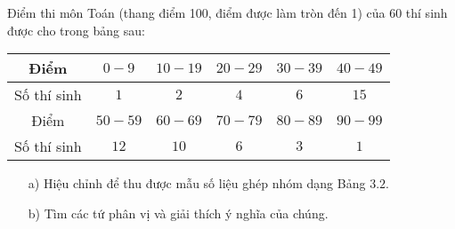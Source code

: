 \begin{bt}%
	Điểm thi môn Toán (thang điểm 100, điểm được làm tròn đến 1) của 60 thí sinh được cho trong bảng sau:
	\begin{center}
		\begin{tabular}{|c|c|c|c|c|c|}
			\hline
			Điểm        & $0-9$   & $10-19$ & $20-29$ & $30-39$ & $40-49$ \\
			\hline
			Số thí sinh & $1$     & $2$     & $4$     & $6$     & $15$    \\
			\hline
			Điểm        & $50-59$ & $60-69$ & $70-79$ & $80-89$ & $90-99$ \\
			\hline
			Số thí sinh & $12$    & $10$    & $6$     & $3$     & $1$     \\
			\hline
		\end{tabular}
	\end{center}
	\begin{enumerate}
		\item [a)] Hiệu chỉnh để thu được mẫu số liệu ghép nhóm dạng Bảng $3.2$.
		\item [b)] Tìm các tứ phân vị và giải thích ý nghĩa của chúng.
	\end{enumerate}
	\loigiai{
		\begin{enumerate}
			\item [a)] Bảng số liệu ghép nhóm về điểm thi môn Toán của 60 thí sinh
			      \begin{center}
				      \begin{tabular}{|c|c|c|c|c|c|}
					      \hline
					      Điểm        & $\left[0;20\right)$ & $\left[20;40\right)$ & $\left[40;60\right)$ & $\left[60;80\right)$ & $\left[80;100\right)$ \\
					      \hline
					      Số thí sinh & $3$                 & $10$                 & $27$                 & $16$                 & $4$                   \\
					      \hline
				      \end{tabular}
			      \end{center}


\end{enumerate}}
\end{bt}
